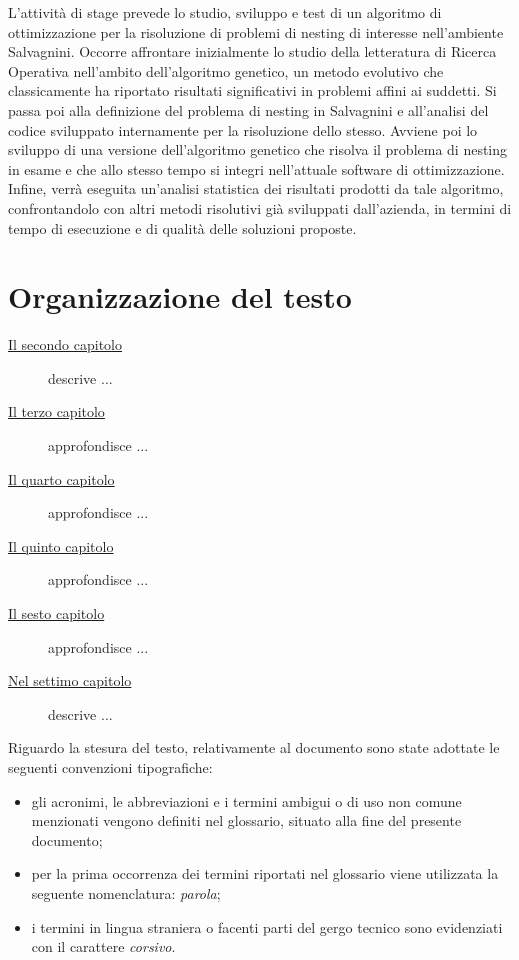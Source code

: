 L’attività di stage prevede lo studio, sviluppo e test di un algoritmo di ottimizzazione per la risoluzione di problemi di nesting di interesse nell’ambiente Salvagnini.
Occorre affrontare inizialmente lo studio della letteratura di Ricerca Operativa nell’ambito dell’algoritmo genetico, un metodo evolutivo che classicamente ha riportato risultati significativi in problemi affini ai suddetti. Si passa poi alla definizione del problema di nesting in Salvagnini e all’analisi del codice sviluppato internamente per la risoluzione dello stesso. Avviene poi lo sviluppo di una versione dell’algoritmo genetico che risolva il problema di nesting in esame e che allo stesso tempo si integri nell’attuale software di ottimizzazione. Infine, verrà eseguita un’analisi statistica dei risultati prodotti da tale algoritmo, confrontandolo con altri metodi risolutivi già sviluppati dall’azienda, in termini di tempo di esecuzione e di qualità delle soluzioni proposte.

\section{Organizzazione del testo}

\begin{description}
    \item[{\hyperref[cap:processi-metodologie]{Il secondo capitolo}}] descrive ...
    
    \item[{\hyperref[cap:descrizione-stage]{Il terzo capitolo}}] approfondisce ...
    
    \item[{\hyperref[cap:analisi-requisiti]{Il quarto capitolo}}] approfondisce ...
    
    \item[{\hyperref[cap:progettazione-codifica]{Il quinto capitolo}}] approfondisce ...
    
    \item[{\hyperref[cap:verifica-validazione]{Il sesto capitolo}}] approfondisce ...
    
    \item[{\hyperref[cap:conclusioni]{Nel settimo capitolo}}] descrive ...
\end{description}

Riguardo la stesura del testo, relativamente al documento sono state adottate le seguenti convenzioni tipografiche:
\begin{itemize}
	\item gli acronimi, le abbreviazioni e i termini ambigui o di uso non comune menzionati vengono definiti nel glossario, situato alla fine del presente documento;
	\item per la prima occorrenza dei termini riportati nel glossario viene utilizzata la seguente nomenclatura: \emph{parola}\glsfirstoccur;
	\item i termini in lingua straniera o facenti parti del gergo tecnico sono evidenziati con il carattere \emph{corsivo}.
\end{itemize}
